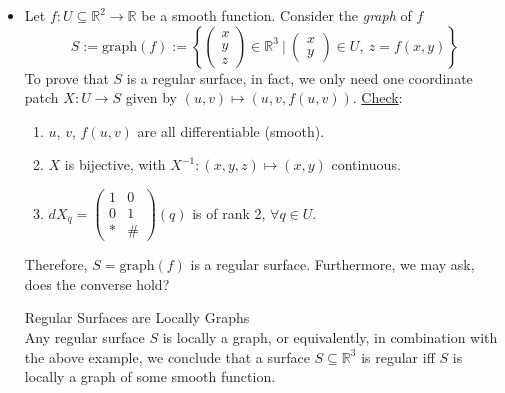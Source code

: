 \noindent\begin{itemize}
\item Let $f: U\subseteq\mathbb{R}^2\to\mathbb{R}$ be a smooth function. Consider the \textit{graph} of $f$
\[
S := \mathrm{graph}(f) := \left\{\begin{pmatrix}x\\ y\\ z\end{pmatrix}\in\mathbb{R}^3 \ \Bigg|\ \begin{pmatrix}x\\ y\end{pmatrix}\in U,\ z = f(x, y)\right\}
\]
To prove that $S$ is a regular surface, in fact, we only need one coordinate patch $X: U\to S$ given by $(u, v)\mapsto(u, v, f(u, v))$. \underline{Check}:

\begin{enumerate}
\item $u$, $v$, $f(u, v)$ are all differentiable (smooth).
\item $X$ is bijective, with $X^{-1}: (x, y, z)\mapsto(x, y)$ continuous.
\item $dX_q = \begin{pmatrix}1 & 0\\ 0 & 1\\ * & \#\end{pmatrix}(q)$ is of rank 2, $\forall q\in U$.
\end{enumerate}

\noindent Therefore, $S = \mathrm{graph}(f)$ is a regular surface. Furthermore, we may ask, does the converse hold?

\begin{proposition}{Regular Surfaces are Locally Graphs}\\
Any regular surface $S$ is locally a graph, or equivalently, in combination with the above example, we conclude that a surface $S\subseteq\mathbb{R}^3$ is regular iff $S$ is locally a graph of some smooth function.
\end{proposition}


\end{itemize}
